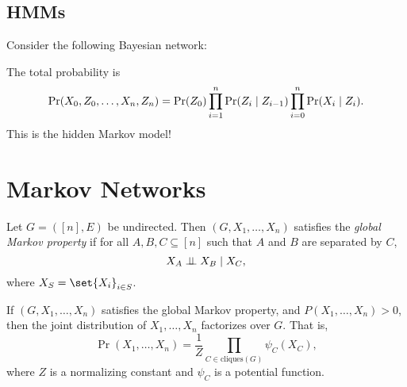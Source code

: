\subsection{HMMs} \label{sec:bayes_networks:hmms}
Consider the following Bayesian network:
\begin{center}
\end{center}
The total probability is \[
    \Pr(X_0, Z_0, \dots, X_n, Z_n)
        = \Pr(Z_0)
            \prod_{i=1}^n \Pr(Z_i \mid Z_{i-1})
            \prod_{i=0}^n \Pr(X_i \mid Z_i).
\] This is the hidden Markov model!

\section{Markov Networks} \label{sec:markov_networks}
\begin{definition*} \label{def:markoc:gmp}
    Let $G = ([n], E)$ be undirected.
    Then $(G, X_1, \dots, X_n)$ satisfies the \emph{global Markov property}
    if for all $A, B, C \subseteq [n]$ such that $A$ and $B$ are separated
    by $C$, \[
        X_A \mathrel{\bot\!\!\!\bot} X_B \mid X_C,
    \] where $X_S = \set{X_i}_{i \in S}$.
\end{definition*}

\begin{theorem} \label{thm:markov_networks:hct}
    If $(G, X_1, \dots, X_n)$ satisfies the global Markov property,
    and $P(X_1, \dots, X_n) > 0$,
    then the joint distribution of $X_1, \dots, X_n$ factorizes over $G$.
    That is, \[
        \Pr(X_1, \dots, X_n)
            = \frac1Z \prod_{C \in \text{cliques}(G)} \psi_C(X_C),
    \] where $Z$ is a normalizing constant and $\psi_C$ is a potential
    function.
\end{theorem}
